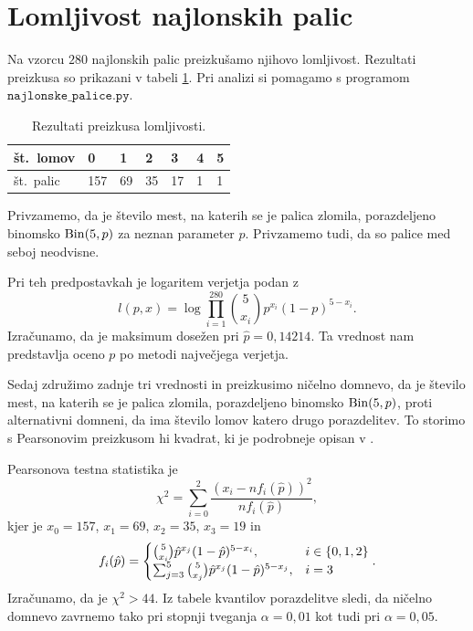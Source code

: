 \documentclass[12pt, a4paper]{article}
\begin{document}
\section{Lomljivost najlonskih palic}
Na vzorcu $280$ najlonskih palic preizkušamo njihovo lomljivost. Rezultati 
preizkusa so prikazani v tabeli \ref{table:lomljivost}. Pri analizi 
si pomagamo s programom $\texttt{najlonske\_palice.py}$.
\begin{table}[H]
    \centering
    \begin{tabular}{|l||l|l|l|l|l|l|}
        \hline
        št.~lomov & 0   & 1  & 2  & 3  & 4 & 5 \\ \hline
        št.~palic & 157 & 69 & 35 & 17 & 1 & 1 \\ \hline
    \end{tabular}
    \caption{Rezultati preizkusa lomljivosti.}
    \label{table:lomljivost}
\end{table}
Privzamemo, da je število mest, na katerih se je palica 
zlomila, porazdeljeno binomsko $\operatorname{Bin}(5, p)$ za neznan parameter $p$.
Privzamemo tudi, da so palice med seboj neodvisne.


Pri teh predpostavkah je logaritem verjetja podan z
\[
    l(p, x) = \log\prod_{i=1}^{280} \binom{5}{x_i}p^{x_i}(1-p)^{5-x_i}.
\]
Izračunamo, da je maksimum 
dosežen pri $\hat p = 0{,}14214$. Ta vrednost
nam predstavlja oceno $p$ po metodi največjega verjetja.


Sedaj združimo zadnje tri vrednosti in preizkusimo ničelno domnevo, da 
je število mest, na katerih se je palica zlomila, porazdeljeno 
binomsko $\operatorname{Bin}(5, p)$, proti alternativni domneni, da ima število 
lomov katero drugo porazdelitev.
To storimo s Pearsonovim preizkusom hi kvadrat, ki je podrobneje
opisan v \cite[poglavje~9.5]{rice2007mathematical}.

Pearsonova testna statistika je
\[
    \chi^2 = \sum_{i=0}^{2}\frac{(x_i - nf_i(\hat p))^2}{nf_i(\hat p)},
\]
kjer je $x_0 = 157$, $x_1 = 69$, $x_2 = 35$, $x_3 = 19$ in
\[
    f_i(\hat p) = \begin{cases}
        \binom{5}{x_i}\hat p^{x_j}(1-\hat p)^{5-x_i}, &i \in \left\{0,1,2\right\} \\
        \sum_{j=3}^{5} \binom{5}{x_j}\hat p^{x_j}(1-\hat p)^{5-x_j}, &i = 3 
    \end{cases}.
\]
Izračunamo, da je $\chi^2 > 44$. Iz tabele kvantilov porazdelitve 
sledi, da ničelno domnevo zavrnemo tako 
pri stopnji tveganja $\alpha = 0{,}01$ kot tudi pri $\alpha = 0{,}05$. 
\end{document}
